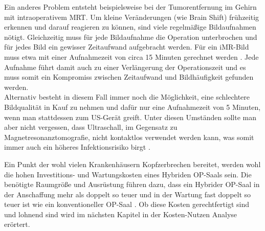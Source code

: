 Ein anderes Problem entsteht beispielsweise bei der Tumorentfernung im Gehirn mit intraoperativem MRT. Um kleine Veränderungen (wie Brain Shift) frühzeitig erkennen und darauf reagieren zu können, sind viele regelmäßige Bildaufnahmen nötigt. Gleichzeitig muss für jede Bildaufnahme die Operation unterbrochen und für jedes Bild ein gewisser Zeitaufwand aufgebracht werden. Für ein iMR-Bild muss etwa mit einer Aufnahmezeit von circa 15 Minuten gerechnet werden \cite{BrainShiftInTumorResection}. Jede Aufnahme führt damit auch zu einer Verlängerung der Operationszeit und es muss somit ein Kompromiss zwischen Zeitaufwand und Bildhäufigkeit gefunden werden.\\
Alternativ besteht in diesem Fall immer noch die Möglichkeit, eine schlechtere Bildqualität in Kauf zu nehmen und dafür nur eine Aufnahmezeit von 5 Minuten, wenn man stattdessen zum US-Gerät greift. Unter diesen Umständen sollte man aber nicht vergessen, dass Ultraschall, im Gegensatz zu Magnetresonanztomografie, nicht kontaktlos verwendet werden kann, was somit immer auch ein höheres Infektionsrisiko birgt \cite{BrainShiftInTumorResection}.

Ein Punkt der wohl vielen Krankenhäusern Kopfzerbrechen bereitet, werden wohl die hohen Investitions- und Wartungskosten eines Hybriden OP-Saals sein. Die benötigte Raumgröße und Ausrüstung führen dazu, dass ein Hybrider OP-Saal in der Anschaffung mehr als doppelt so teuer und in der Wartung fast doppelt so teuer ist wie ein konventioneller OP-Saal \cite{HybridOR}. 
Ob diese Kosten gerechtfertigt sind und lohnend sind wird im nächsten Kapitel in der Kosten-Nutzen Analyse erörtert.

